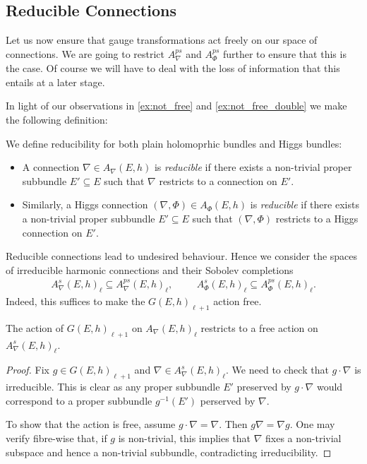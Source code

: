 \documentclass[12pt]{ociamthesis}  %
\begin{document}
\subsection{Reducible Connections}

Let us now ensure that gauge transformations act freely on
our space of connections. We are going to restrict $A^{ps}_\nabla$ and
$A^{ps}_\Phi$ further to ensure that this is the case. Of course we will have
to deal with the loss of information that this entails at a later stage.

In light of our observations in \ref{ex:not_free} and \ref{ex:not_free_double}
we make the following definition:

\begin{definition}
  We define reducibility for both plain holomoprhic bundles and Higgs
  bundles:
  \begin{itemize}
    \item A connection $\nabla\in A_\nabla (E,h)$ is \emph{reducible} if there exists
          a non-trivial proper subbundle $E'\subseteq E$ such that $\nabla$ restricts
          to a connection on $E'$.
    \item Similarly, a Higgs connection $(\nabla,\Phi)\in A_\Phi(E,h)$ is
          \emph{reducible} if there exists a non-trivial proper subbundle $E'\subseteq E$
          such that $(\nabla,\Phi)$ restricts to a Higgs connection on $E'$.
  \end{itemize}
\end{definition}

Reducible connections lead to undesired behaviour. Hence we
consider the spaces of irreducible harmonic connections and their Sobolev
completions
\begin{align*}
  A^s_\nabla(E,h)_\ell \subseteq A^{ps}_\nabla(E,h)_\ell,\hspace{1cm}
  A^s_\Phi(E,h)_\ell \subseteq A^{ps}_\Phi(E,h)_\ell.
\end{align*}
Indeed, this suffices to make the $G(E,h)_{\ell+1}$ action free.

\begin{lemma}\label{lem:free_action}
  The action of $G(E,h)_{\ell+1}$ on $A_\nabla(E,h)_\ell$
  restricts to a free action on $A^s_\nabla(E,h)_\ell$.
  \begin{proof}
    Fix $g\in G(E,h)_{\ell+1}$ and $\nabla\in A^s_\nabla(E,h)_\ell$.
    We need to check that $g\cdot\nabla$ is irreducible. This is clear
    as any proper subbundle $E'$ preserved by $g\cdot\nabla$ would correspond
    to a proper subbundle $g^{-1}(E')$  perserved by $\nabla$.

    To show that the action is free, assume $g\cdot\nabla = \nabla$.
    Then $g\nabla = \nabla g$. One may verify fibre-wise that, if $g$
    is non-trivial, this implies that $\nabla$ fixes a non-trivial
    subspace and hence a non-trivial subbundle, contradicting irreducibility.
  \end{proof}
\end{lemma}
\end{document}
